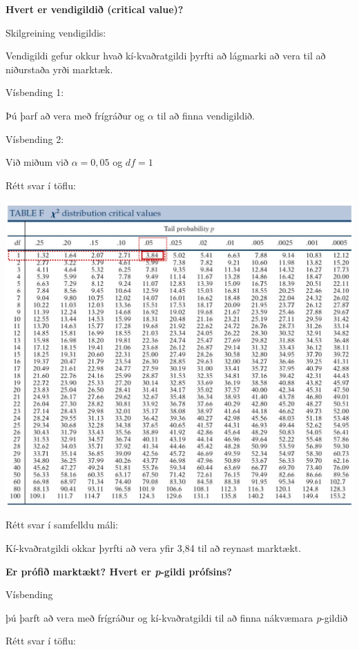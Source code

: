 \documentclass[
]{book}
\begin{document}
\textbf{Hvert er vendigildið (critical value)?}

Skilgreining vendigildis:

Vendigildi gefur okkur hvað kí-kvaðratgildi þyrfti að lágmarki að vera til að niðurstaða yrði marktæk.

Vísbending 1:

Þú þarf að vera með frígráður og \(\alpha\) til að finna vendigildið.

Vísbending 2:

Við miðum við \({\alpha}=0,05\) og \({df}=1\)

Rétt svar í töflu:

\includegraphics{images/image-490270489.png}

Rétt svar í samfelldu máli:

Kí-kvaðratgildi okkar þyrfti að vera yfir 3,84 til að reynast marktækt.

\textbf{Er prófið marktækt? Hvert er \emph{p}-gildi prófsins?}

Vísbending

þú þarft að vera með frígráður og kí-kvaðratgildi til að finna nákvæmara \emph{p}-gildið

Rétt svar í töflu:
\end{document}
